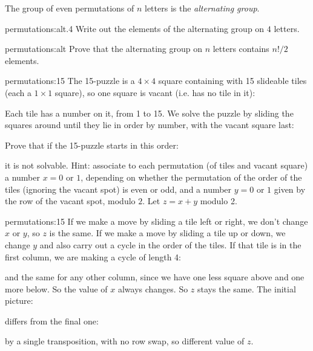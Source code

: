 The group of even permutations of \(n\) letters is the \emph{alternating group}.
\begin{problem}{permutations:alt.4}
Write out the elements of the alternating group on \(4\) letters.
\end{problem}
\begin{problem}{permutations:alt}
Prove that the alternating group on \(n\) letters contains \(n!/2\) elements.
\end{problem}
\begin{problem}{permutations:15}
The 15-puzzle is a \(4 \times 4\) square containing with 15 slideable tiles (each a \(1 \times 1\) square), so one square is vacant (i.e. has no tile in it):
\begin{center}

\end{center}
Each tile has a number on it, from 1 to 15.
We solve the puzzle by sliding the squares around until they lie in order by number, with the vacant square last:
\begin{center}

\end{center}
Prove that if the 15-puzzle starts in this order:
\begin{center}

\end{center}
it is not solvable.
Hint: associate to each permutation (of tiles and vacant square) a number \(x=0\) or \(1\), depending on whether the permutation of the order of the tiles (ignoring the vacant spot) is even or odd, and a number \(y=0\) or \(1\) given by the row of the vacant spot, modulo \(2\).
Let \(z=x+y\) modulo 2.
\end{problem}
\begin{answer}{permutations:15}
If we make a move by sliding a tile left or right, we don't change \(x\) or \(y\), so \(z\) is the same.
If we make a move by sliding a tile up or down, we change \(y\) and also carry out a cycle in the order of the tiles.
If that tile is in the first column, we are making a cycle of length 4:
\begin{center}

\end{center}
and the same for any other column, since we have one less square above and one more below.
So the value of \(x\) always changes.
So \(z\) stays the same.
The initial picture:
\begin{center}

\end{center}
differs from the final one:
\begin{center}

\end{center}
by a single transposition, with no row swap, so different value of \(z\).
\end{answer}

